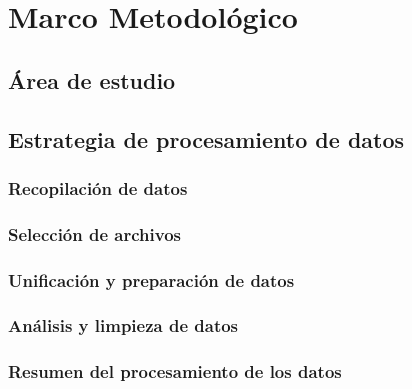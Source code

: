 \section{Marco Metodológico}

\subsection{Área de estudio}

\subsection{Estrategia de procesamiento de datos}
\subsubsection{Recopilación de datos}
\subsubsection{Selección de archivos}
\subsubsection{Unificación y preparación de datos}
\subsubsection{Análisis y limpieza de datos}
\subsubsection{Resumen del procesamiento de los datos}
